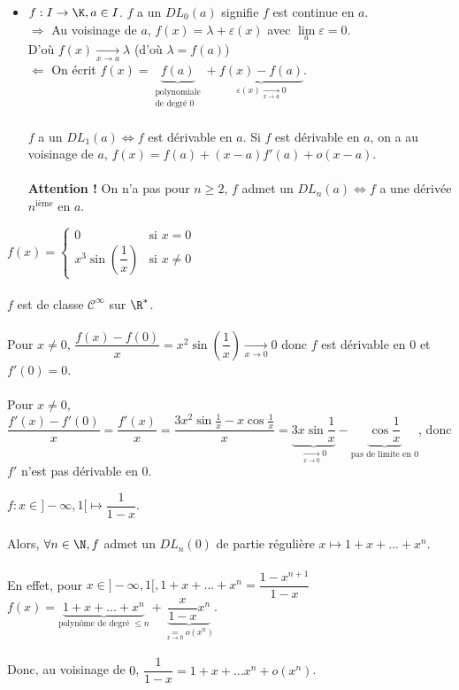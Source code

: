 \documentclass[12pt,a4paper]{report}
\begin{document}
\begin{remarque}
\begin{itemize}
	\item $f : I \to \K, a \in I$. $f$ a un $DL_0(a)$ signifie $f$ est continue en $a$. \\
	$\Longrightarrow$ Au voisinage de $a$, $f(x) = \lambda + \varepsilon(x)$ avec $\underset{a}{\lim} \varepsilon = 0$. \\
	D'où $f(x) \xrightarrow[x \to a]{} \lambda$ (d'où $\lambda = f(a)$) \\
	$\Longleftarrow$ On écrit $f(x) = \underbrace{f(a)}_{\substack{\text{polynomiale} \\ \text{de degré } 0}} + \underbrace{f(x)-f(a)}_{\varepsilon(x) \xrightarrow[x \to a]{} 0}$. \\ \\
	$f$ a un $DL_1(a) \Longleftrightarrow f$ est dérivable en $a$. Si $f$ est dérivable en $a$, on a au voisinage de $a$, $f(x) = f(a) + (x-a)f'(a) + o(x-a)$. \\ \\
	\textbf{Attention !} On n'a pas pour $n \ge 2$, $f$ admet un $DL_n(a) \Longleftrightarrow f$ a une dérivée $n^{\text{ième}}$ en $a$.
\end{itemize}
\end{remarque}

\begin{exemple}
$f(x) = \begin{cases}
0 &\text{si } x=0 \\
x^3\sin\left(\dfrac{1}{x}\right) &\text{si } x \neq 0
\end{cases}$ \\ \\
$f$ est de classe $\mathcal{C}^{\infty}$ sur $\R^*$. \\ \\
Pour $x \neq 0$, $\dfrac{f(x)-f(0)}{x} = x^2\sin\left(\dfrac{1}{x}\right) \xrightarrow[x \to 0]{} 0$ donc $f$ est dérivable en $0$ et $f'(0) = 0$. \\ \\
Pour $x \neq 0$, $\dfrac{f'(x)-f'(0)}{x} = \dfrac{f'(x)}{x} = \dfrac{3x^2\sin \frac{1}{x} - x \cos \frac{1}{x}}{x} = \underbrace{3x \sin \dfrac{1}{x}}_{\xrightarrow[x \to 0]{} 0} - \underbrace{\cos \dfrac{1}{x}}_{\text{pas de limite en } 0}$, donc $f'$ n'est pas dérivable en $0$.
\end{exemple}

\begin{exemple}
$f : x \in ]-\infty,1[ \mapsto \dfrac{1}{1-x}$. \\ \\
Alors, $\forall n \in \N, f$ admet un $DL_n(0)$ de partie régulière $x \mapsto 1+x+...+x^n$. \\ \\
En effet, pour $x \in ]-\infty,1[, 1+x+...+x^n = \dfrac{1-x^{n+1}}{1-x}$ \ie $f(x) = \underbrace{1+x+...+x^n}_{\text{polynôme de degré } \le n} + \underbrace{\dfrac{x}{1-x} x^n}_{\underset{x \to 0}{=} o(x^n)}$. \\ \\
Donc, au voisinage de $0$, $\dfrac{1}{1-x} = 1+x+...x^n + o(x^n)$.
\end{exemple}
\end{document}
